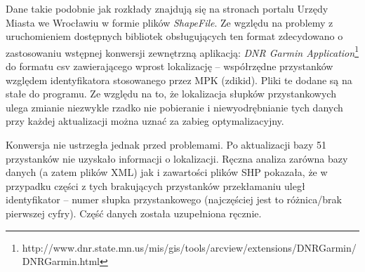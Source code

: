\documentclass[a4paper,12pt]{article}
\begin{document}
  Dane takie podobnie jak rozkłady znajdują się na stronach portalu Urzędy
  Miasta we Wrocławiu w formie plików \emph{ShapeFile}. Ze wgzlędu na problemy
  z uruchomieniem dostępnych bibliotek obsługujących ten format zdecydowano o
  zastosowaniu wstępnej konwersji zewnętrzną aplikacją: \emph{DNR Garmin
  Application}\footnote{http://www.dnr.state.mn.us/mis/gis/tools/arcview/extensions/DNRGarmin/DNRGarmin.html}
  do formatu csv zawierającego wprost lokalizację -- współrzędne przystanków
  względem identyfikatora stosowanego przez MPK (zdikid). Pliki te dodane są na
  stałe do programu. Ze względu na to, że lokalizacja słupków przystankowych
  ulega zmianie niezwykle rzadko nie pobieranie i niewyodrębnianie tych danych
  przy każdej aktualizacji można uznać za zabieg optymalizacyjny. 
  
  Konwersja nie ustrzegła jednak przed problemami. Po aktualizacji bazy 51
  przystanków nie uzyskało informacji o lokalizacji. Ręczna analiza zarówna
  bazy danych (a zatem plików XML) jak i zawartości plików SHP pokazała, że w
  przypadku części z tych brakujących przystanków przekłamaniu uległ
  identyfikator -- numer słupka przystankowego (najczęściej jest to
  różnica/brak pierwszej cyfry). Część danych została uzupełniona ręcznie.
\end{document}

